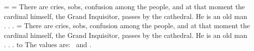 \def\tstoryA{There are cries, sobs, confusion among the people, and at
that moment the cardinal himself, the Grand Inquisitor, passes by the
cathedral. He is an old man . . .}
{}
=\lefthyphenmin
{}=\vbox{\hsize=2.25in \tstoryA}
=\vbox{\hsize=2.25in \tstoryA}
\hbox to 
The values are: \the{}\ and \the\lefthyphenmin.
\bye
